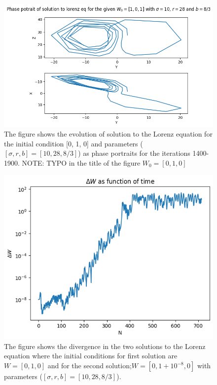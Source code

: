 \documentclass[12pt]{article}
\begin{document}
\begin{figure}[hbt!]
    \centering
    \includegraphics[width=\textwidth]{Plots/Q2_4.png}
    \caption{The figure shows the evolution of solution to the Lorenz equation for the initial condition [0, 1, 0] and parameters ($[\sigma, r, b] = [10, 28, 8/3]$) as phase portraits for the iterations 1400-1900. NOTE: TYPO in the title of the figure $W_0 = [0, 1, 0]$}
    \label{fig: Q2_4}
\end{figure}

\begin{figure}[hbt!]
    \centering
    \includegraphics[width=\textwidth]{Plots/Q2_5.png}
    \caption{The figure shows the divergence in the two solutions to the Lorenz equation where the initial conditions for first solution are $W = [0, 1, 0]$ and for the second solution;$W = [0, 1 + 10^{-8}, 0]$  with parameters ($[\sigma, r, b] = [10, 28, 8/3]$).}
    \label{fig: Q2_5}
\end{figure}
\end{document}
